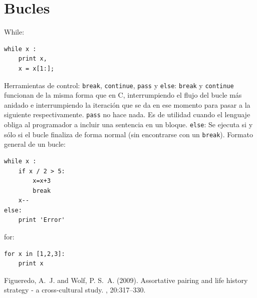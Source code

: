 \documentclass[12pt]{article} %
\begin{document}
\section{Bucles}
While:
\begin{lstlisting}[frame=single, showspaces=false]
while x :
	print x,
	x = x[1:];
\end{lstlisting}
Herramientas de control: \verb+break+, \verb+continue+, \verb+pass+ y \verb+else+:
\verb+break+ y \verb+continue+ funcionan de la misma forma que en C, interrumpiendo el flujo del bucle más anidado e interrumpiendo la iteración que se da en ese momento para pasar a la siguiente respectivamente.
\verb+pass+ no hace nada. Es de utilidad cuando el lenguaje obliga al programador a incluir una sentencia en un bloque.
\verb+else+: Se ejecuta si y sólo si el bucle finaliza de forma normal (sin encontrarse con un \verb+break+).
Formato general de un bucle:
\begin{lstlisting}[frame=single, showspaces=false]
while x :
	if x / 2 > 5:
		x=x+3
		break
	x--
else:
	print 'Error'
\end{lstlisting}
\Large for:
\begin{lstlisting}[frame=single, showspaces=false]
for x in [1,2,3]:
	print x
\end{lstlisting}


\begin{thebibliography}{99} %

Figueredo, A.~J. and Wolf, P. S.~A. (2009).
\newblock Assortative pairing and life history strategy - a cross-cultural
  study.
, 20:317--330.
 
\end{thebibliography}

\end{document}
